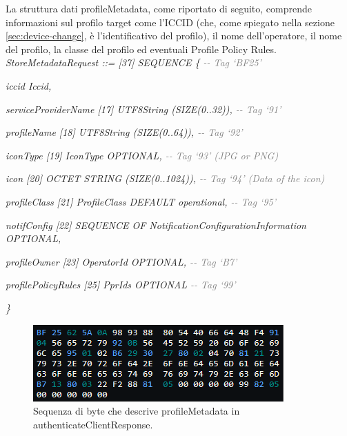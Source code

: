 \documentclass[10pt, oneside]{book}
\begin{document}
La struttura dati profileMetadata, come riportato di seguito, comprende informazioni sul profilo target come l'ICCID (che, come spiegato nella sezione \ref{sec:device-change}, è l'identificativo del profilo), il nome dell'operatore, il nome del profilo, la classe del profilo ed eventuali Profile Policy Rules.\\

\textit{StoreMetadataRequest ::= [37] SEQUENCE \{ \textcolor{gray}{{-}{-} Tag `BF25'}}

\hspace{0.75cm} \textit{iccid Iccid,}

\hspace{0.75cm} \textit{serviceProviderName [17] UTF8String (SIZE(0..32)), \textcolor{gray}{{-}{-} Tag `91'}}

\hspace{0.75cm} \textit{profileName [18] UTF8String (SIZE(0..64)), \textcolor{gray}{{-}{-} Tag `92'}}

\hspace{0.75cm} \textit{iconType [19] IconType OPTIONAL, \textcolor{gray}{{-}{-} Tag `93' (JPG or PNG)}}

\hspace{0.75cm} \textit{icon [20] OCTET STRING (SIZE(0..1024)), \textcolor{gray}{{-}{-} Tag `94' (Data of the icon)}}

\hspace{0.75cm} \textit{profileClass [21] ProfileClass DEFAULT operational, \textcolor{gray}{{-}{-} Tag `95'}}

\hspace{0.75cm} \textit{notifConfig [22] SEQUENCE OF NotificationConfigurationInformation OPTIONAL,}

\hspace{0.75cm} \textit{profileOwner [23] OperatorId OPTIONAL, \textcolor{gray}{{-}{-} Tag `B7'}}

\hspace{0.75cm} \textit{profilePolicyRules [25] PprIds OPTIONAL \textcolor{gray}{{-}{-} Tag `99'}}

\textit{\}\\}

\begin{figure}
\includegraphics[width=\linewidth]{asn1-profileMetadata.png}
\caption{Sequenza di byte che descrive profileMetadata in authenticateClientResponse.}
\label{fig:asn1-profileMetadata}
\end{figure}
\end{document}
